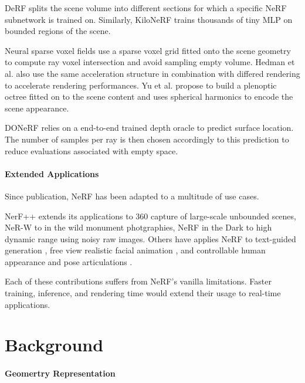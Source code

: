 DeRF  splits the scene volume into different sections for which a specific \gls{NeRF} subnetwork is trained on. Similarly, KiloNeRF  trains thousands of tiny \gls{MLP} on bounded regions of the scene.

Neural sparse voxel fields  use a sparse voxel grid fitted onto the scene geometry to compute ray voxel intersection and avoid sampling empty volume. Hedman et al.  also use the same acceleration structure in combination with differed rendering to accelerate rendering performances. Yu et al.  propose to build a plenoptic octree fitted on to the scene content and uses spherical harmonics to encode the scene appearance.

DONeRF  relies on a end-to-end trained depth oracle to predict surface location. The number of samples per ray is then chosen accordingly to this prediction to reduce evaluations associated with empty space.

\paragraph{Extended Applications}

Since publication, \gls{NeRF} has been adapted to a multitude of use cases.

NerF++  extends its applications to 360 capture of large-scale unbounded scenes, NeR-W  to in the wild monument photgraphies, NeRF in the Dark  to high dynamic range using noisy raw images. Others have applies \gls{NeRF} to text-guided generation , free view realistic facial animation , and controllable human appearance and pose articulations .

Each of these contributions suffers from \gls{NeRF}'s vanilla limitations. Faster training, inference, and rendering time would extend their usage to real-time applications.

\glsresetall
\section{Background}

\paragraph{Geomertry Representation}


